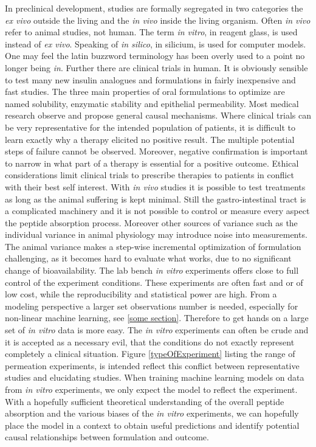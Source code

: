In preclinical development, studies are formally segregated in two categories the \textit{ex vivo} outside the living and the \textit{in vivo} inside the living organism. Often \textit{in vivo} refer to animal studies, not human. The term \textit{in vitro}, in reagent glass, is used instead of \textit{ex vivo}. Speaking of \textit{in silico}, in silicium, is used for computer models. One may feel the latin buzzword terminology has been overly used to a point no longer being \textit{in}. Further there are clinical trials in human. It is obviously sensible to test many new insulin analogues and formulations in fairly inexpensive and fast studies. The three main properties of oral formulations to optimize are named  solubility, enzymatic stability and epithelial permeability. Most medical research observe and propose general causal mechanisms. Where clinical trials can be very representative for the intended population of patients, it is difficult to learn exactly why a therapy elicited no positive result. The multiple potential steps of failure cannot be observed. Moreover, negative confirmation is important to narrow in what part of a therapy is essential for a positive outcome. Ethical considerations limit clinical trials to prescribe therapies to patients in conflict with their best self interest. With \textit{in vivo} studies it is possible to test treatments as long as the animal suffering is kept minimal. Still the gastro-intestinal tract is a complicated machinery and it is not possible to control or measure every aspect the peptide absorption process. Moreover other sources of variance such as the individual variance in animal physiology may introduce noise into measurements. The animal variance makes a step-wise incremental optimization of formulation challenging, as it becomes hard to evaluate what works, due to no significant change of bioavailability. The lab bench \textit{in vitro} experiments offers close to full control of the experiment conditions. These experiments are often fast and or of low cost, while the reproducibility and statistical power are high. From a modeling perspective a larger set observations number is needed, especially for non-linear machine learning, see \ref{some section}. Therefore to get hands on a large set of \textit{in vitro} data is more easy. The \textit{in vitro} experiments can often be crude and it is accepted as a necessary evil, that the conditions do not exactly represent completely a clinical situation. Figure \ref{typeOfExperiment} listing the range of permeation experiments, is intended reflect this conflict between representative studies and elucidating studies.
When training machine learning models on data from \textit{in vitro} experiments, we only expect the model to reflect the experiment. With a hopefully sufficient theoretical understanding of the overall peptide absorption and the various biases of the \textit{in vitro} experiments, we can hopefully place the model in a context to obtain useful predictions and identify potential causal relationships between formulation and outcome.

